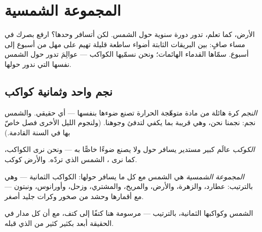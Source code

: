 \chapter{المجموعة الشمسية}\label{ch:g4:solar-system}

الأرض، كما تعلم، تدور دورة سنوية حول الشمس. لكن أتسافر وحدها؟
ارفع بصرك في مساء صافٍ: بين البريقات الثابتة أضواء ساطعة قليلة
تهيم على مهل من أسبوع إلى أسبوع. سمّاها القدماء الهائمات؛ ونحن
نسمّيها الكواكب --- عوالِمَ تدور حول الشمس نفسها التي ندور
حولها.

\section{نجم واحد وثمانية كواكب}

\begin{definition}[النجم]\label{def:g4:solar-system:star}
\emph{النجم} كرة هائلة من مادة متوهّجة الحرارة تصنع
ضوءها بنفسها --- أي  حقيقي. والشمس نجم: نجمنا نحن،
وهي قريبة بما يكفي لتدفئ وجوهنا. (ولنجوم الليل الأخرى فصل خاصّ
بها في السنة القادمة.)
\end{definition}

\begin{definition}[الكوكب]\label{def:g4:solar-system:planet}
\emph{الكوكب} عالَم كبير مستدير يسافر حول  ولا
يصنع ضوءًا خاصًّا به --- ونحن نرى الكواكب، كما نرى ، 
الشمس الذي تردّه. والأرض كوكب.
\end{definition}

\begin{definition}\label{def:g4:solar-system:family}
\emph{المجموعة الشمسية} هي الشمس مع كل ما
يسافر حولها: الكواكب الثمانية --- وهي بالترتيب: عطارد، والزهرة،
والأرض، والمريخ، والمشتري، وزحل، وأورانوس، ونبتون --- مع
أقمارها وحشد من صخور وكرات جليد أصغر.
\end{definition}

\begin{omfigure}

{\small الشمس وكواكبها الثمانية، بالترتيب --- مرسومة هنا كتفًا
إلى كتف، مع أن كل مدار في الحقيقة أبعد بكثير كثير من الذي
قبله.}
\end{omfigure}

